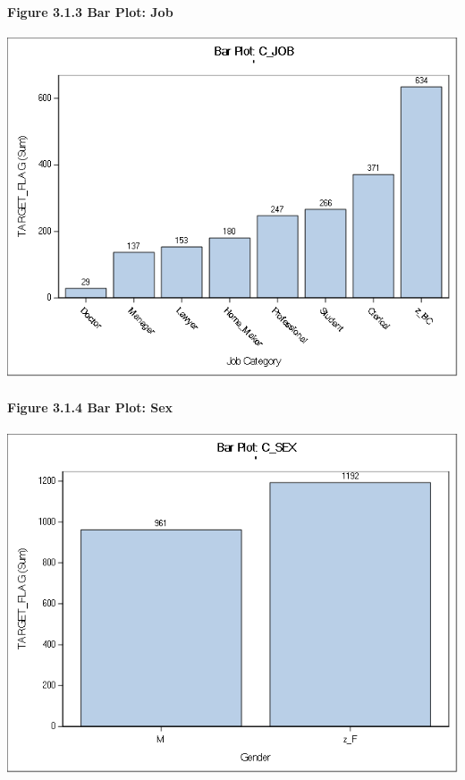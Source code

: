 \documentclass[]{article}
\let\oldparagraph\paragraph
\renewcommand{\paragraph}[1]{\oldparagraph{#1}\mbox{}}
\begin{document}
\newpage

\paragraph{Figure 3.1.3 Bar Plot: Job}\label{figure-3.1.3-bar-plot-job}

\includegraphics[height=3.95833in]{images/bar_job.png}

\paragraph{Figure 3.1.4 Bar Plot: Sex}\label{figure-3.1.4-bar-plot-sex}

\includegraphics[height=3.95833in]{images/bar_sex.png}
\end{document}
